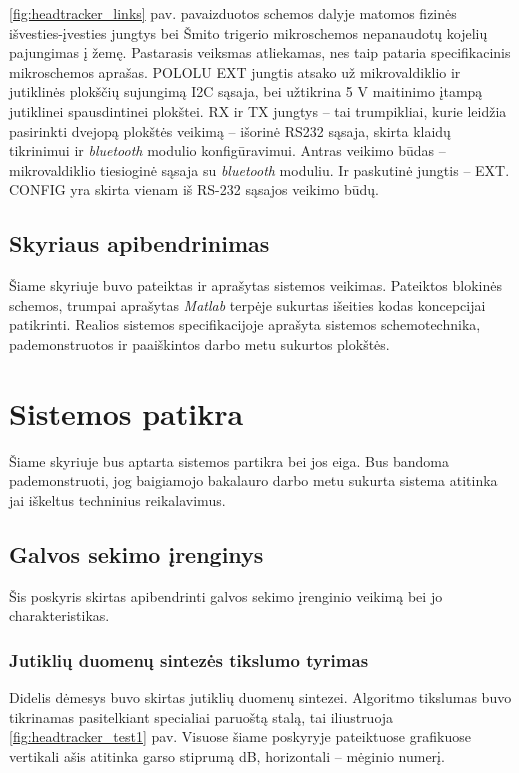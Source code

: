 \documentclass[]{vgtuef}
\begin{document}
{\ref{fig:headtracker_links} pav. pavaizduotos schemos dalyje matomos fizinės išvesties-įvesties jungtys bei Šmito trigerio mikroschemos nepanaudotų kojelių pajungimas į žemę. Pastarasis veiksmas atliekamas, nes taip pataria specifikacinis mikroschemos aprašas. POLOLU EXT jungtis atsako už mikrovaldiklio ir jutiklinės plokščių sujungimą I2C sąsaja, bei užtikrina 5 V maitinimo įtampą jutiklinei spausdintinei plokštei. RX ir TX jungtys – tai trumpikliai, kurie leidžia pasirinkti dvejopą plokštės veikimą – išorinė RS232 sąsaja, skirta klaidų tikrinimui ir \textit{bluetooth} modulio konfigūravimui. Antras veikimo būdas – mikrovaldiklio tiesioginė sąsaja su \textit{bluetooth} moduliu. Ir paskutinė jungtis – EXT. CONFIG yra skirta vienam iš RS-232 sąsajos veikimo būdų.

\subsection{Skyriaus apibendrinimas}

Šiame skyriuje buvo pateiktas ir aprašytas sistemos veikimas. Pateiktos blokinės schemos, trumpai aprašytas \textit{Matlab} terpėje sukurtas išeities kodas koncepcijai patikrinti. Realios sistemos specifikacijoje aprašyta sistemos schemotechnika, pademonstruotos ir paaiškintos darbo metu sukurtos plokštės.

\section{Sistemos patikra}

Šiame skyriuje bus aptarta sistemos partikra bei jos eiga. Bus bandoma pademonstruoti, jog baigiamojo bakalauro darbo metu sukurta sistema atitinka jai iškeltus techninius reikalavimus.

\subsection{Galvos sekimo įrenginys}

Šis poskyris skirtas apibendrinti galvos sekimo įrenginio veikimą bei jo charakteristikas.

\subsubsection{Jutiklių duomenų sintezės tikslumo tyrimas}

Didelis dėmesys buvo skirtas jutiklių duomenų sintezei. Algoritmo tikslumas buvo tikrinamas pasitelkiant specialiai paruoštą stalą, tai iliustruoja \ref{fig:headtracker_test1} pav. Visuose šiame poskyryje pateiktuose grafikuose vertikali ašis atitinka garso stiprumą dB, horizontali -- mėginio numerį.

}
\end{document}
